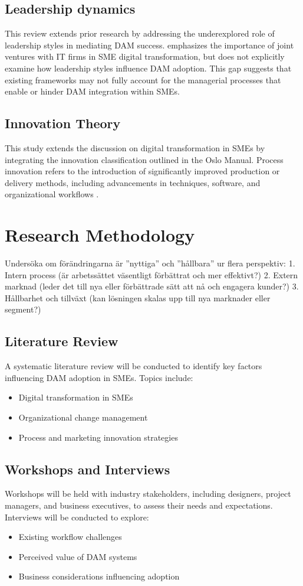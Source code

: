 \documentclass[a4paper,12pt,twocolumn]{article}
\begin{document}
\subsection{Leadership dynamics}
This review extends prior research by addressing the underexplored role of leadership styles in mediating DAM success. 
\cite{Civelek2023} emphasizes the importance of joint ventures with IT firms in SME digital transformation, but does not explicitly examine how leadership styles influence 
DAM adoption. This gap suggests that existing frameworks may not fully account for the managerial processes that enable or hinder DAM integration within SMEs.

\subsection{Innovation Theory}
This study extends the discussion on digital transformation in SMEs by integrating the innovation classification outlined in the Oslo Manual.
Process innovation refers to the introduction of significantly improved production or delivery methods, including advancements in techniques, software, and organizational workflows \cite{oecd2018oslo}. 

\section{Research Methodology}
Undersöka om förändringarna är ”nyttiga” och ”hållbara” ur flera perspektiv:
1. Intern process (är arbetssättet väsentligt förbättrat och mer effektivt?)
2. Extern marknad (leder det till nya eller förbättrade sätt att nå och engagera kunder?)
3. Hållbarhet och tillväxt (kan lösningen skalas upp till nya marknader eller segment?)

\subsection{Literature Review}
A systematic literature review will be conducted to identify key factors influencing DAM adoption in SMEs. Topics include:
\begin{itemize}
    \item Digital transformation in SMEs
    \item Organizational change management
    \item Process and marketing innovation strategies
\end{itemize}

\subsection{Workshops and Interviews}
Workshops will be held with industry stakeholders, including designers, project managers, and business executives, to assess their needs and expectations. Interviews will be conducted to explore:
\begin{itemize}
    \item Existing workflow challenges
    \item Perceived value of DAM systems
    \item Business considerations influencing adoption
\end{itemize}
\end{document}
